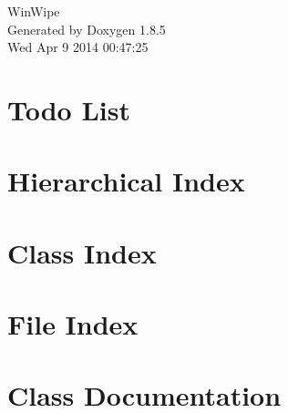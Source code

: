 \documentclass[twoside]{book}
\newcommand{\clearemptydoublepage}{%
  \newpage{\pagestyle{empty}\cleardoublepage}%
}
\begin{document}
\begin{titlepage}
\vspace*{7cm}
\begin{center}%
{\Large Win\-Wipe }\\
\vspace*{1cm}
{\large Generated by Doxygen 1.8.5}\\
\vspace*{0.5cm}
{\small Wed Apr 9 2014 00:47:25}\\
\end{center}
\end{titlepage}
\clearemptydoublepage
\tableofcontents
\clearemptydoublepage
{}

\chapter{Todo List}
\label{todo}

\chapter{Hierarchical Index}

\chapter{Class Index}

\chapter{File Index}

\chapter{Class Documentation}






















\end{document}
